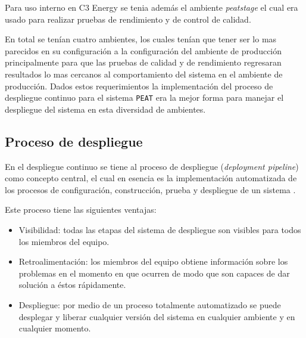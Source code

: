 Para uso interno en C3 Energy se tenia además el ambiente \textit{peatstage}
el cual era usado para realizar pruebas de rendimiento y de control de calidad.

En total se tenían cuatro ambientes, los cuales tenían que tener ser lo mas
parecidos en su configuración a la configuración del ambiente de producción
principalmente para que las pruebas de calidad y de rendimiento regresaran resultados
lo mas cercanos al comportamiento del sistema en el ambiente de producción.
Dados estos requerimientos la implementación del proceso de despliegue continuo para
el sistema \texttt{PEAT} era la mejor forma para manejar el despliegue del sistema
en esta diversidad de ambientes.

\subsection{Proceso de despliegue}

En el despliegue continuo se tiene al proceso de despliegue (\textit{deployment
  pipeline}) como concepto central, el cual en esencia es la implementación
automatizada de los procesos de configuración, construcción, prueba y despliegue de
un sistema \cite{28_humble_farley_2011}.

\vspace{2.5mm}

Este proceso tiene las siguientes ventajas:
\begin{itemize}
\item Visibilidad: todas las etapas del sistema de despliegue son visibles
  para todos los miembros del equipo.
\item Retroalimentación: los miembros del equipo obtiene información sobre los
  problemas en el momento en que ocurren de modo que son capaces de dar solución
  a éstos rápidamente.
\item Despliegue: por medio de un proceso totalmente automatizado se puede
  desplegar y liberar cualquier versión del sistema en cualquier ambiente y en
  cualquier momento.
\end{itemize}

